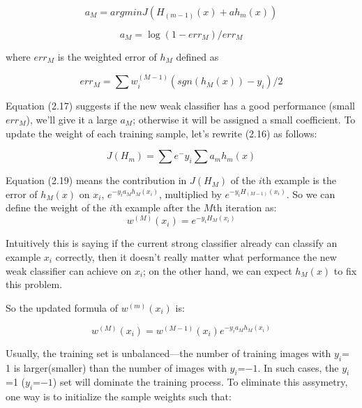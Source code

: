 \documentclass[12pt, twoside]{report}
\begin{document}
	\begin{equation}
	a_M = argminJ(H_(m-1)(x)+ah_m(x))
	\end{equation}
	
	\begin{equation}
	a_M=\log (1-err_M ) /err_M  
	\end{equation}
	
	where $err_M$ is the weighted error of $h_M$ defined as
	
	\begin{equation}
	err_M=\sum w_i^(M-1)(sgn(h_M(x))-y_i)/2
	\end{equation}
	
	Equation (2.17) suggests if the new weak classifier has a good performance (small $err_M$),
	we’ll give it a large $a_M$; otherwise it will be assigned a small coefficient.
	To update the weight of each training sample, let’s rewrite (2.16) as follows:
	
	\begin{equation}
	J(H_m)=\sum e^-y_i \sum a_m h_m (x)
	\end{equation}
	
	\newpage
	\par
	Equation (2.19) means the contribution in $J(H_M)$ of the $i$th example is the error of $h_M(x)$ on $x_i$, $e^{-y_ia_Mh_M(x_i)}$, multiplied by $e^{-y_iH_{(M-1)}(x_i)}$. So we can define the weight of the $i$th example after the $M$th iteration as:
	\begin{equation}
		w^{(M)}(x_i) = e^{-y_iH_M(x_i)}
	\end{equation}

	\par
	Intuitively this is saying if the current strong classifier already can classify an example $x_i$ correctly, then it doesn’t really matter what performance the new weak classifier can achieve on $x_i$; on the other hand, we can expect $h_M(x)$ to fix this problem.

	\par	
	So the updated formula of $w^{(m)}(x_i)$ is:

	\begin{equation}
		w^{(M)}(x_i) = w^{(M-1)}(x_i)e^{-y_ia_Mh_M(x_i)}
	\end{equation}

	\par	
	Usually, the training set is unbalanced—the number of training images with $y_i$= 1 is larger(smaller) than the number of images with $y_i$=$-1$. In such cases, the $y_i$=1 ($y_i$=$-1$) set will dominate the training process. To eliminate this assymetry, one way is to initialize the sample weights such that:
\end{document}
